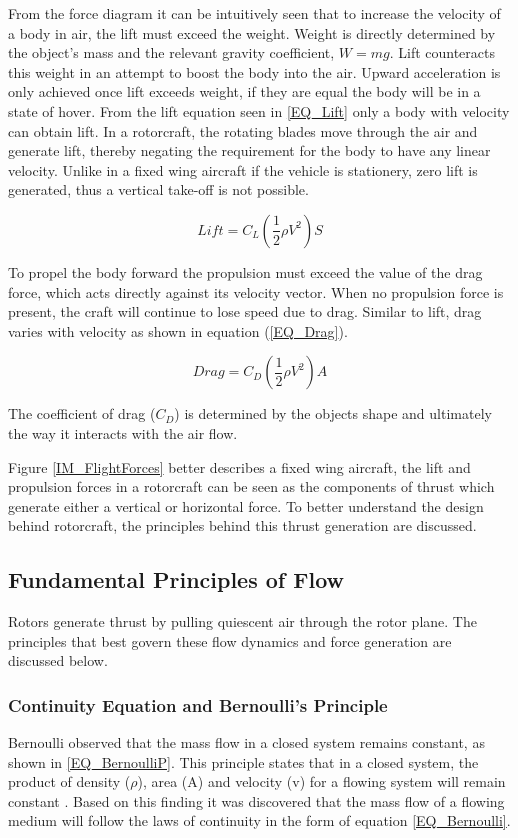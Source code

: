 From the force diagram it can be intuitively seen that to increase the velocity of a body in air, the lift must exceed the weight.
Weight is directly determined by the object's mass and the relevant gravity coefficient, $W = mg$. Lift counteracts this weight in an attempt to boost the body into the air. Upward acceleration is only achieved once lift exceeds weight, if they are equal the body will be in a state of hover. From the lift equation seen in \eqref{EQ_Lift} only a body with velocity can obtain lift. In a rotorcraft, the rotating blades move through the air and generate lift, thereby negating the requirement for the body to have any linear velocity. Unlike in a fixed wing aircraft if the vehicle is stationery, zero lift is generated, thus a vertical take-off is not possible. 

\begin{equation}
\label{EQ_Lift}
Lift = C_L(\frac{1}{2} \rho V^2) S
\end{equation}

To propel the body forward the propulsion must exceed the value of the drag force, which acts directly against its velocity vector. When no propulsion force is present, the craft will continue to lose speed due to drag. Similar to lift, drag varies with velocity as shown in equation (\ref{EQ_Drag}).

\begin{equation}
\label{EQ_Drag}
Drag = C_D (\frac{1}{2} \rho V^2) A
\end{equation}

The coefficient of drag ($C_D$) is determined by the objects shape and ultimately the way it interacts with the air flow. 

Figure \ref{IM_FlightForces} better describes a fixed wing aircraft, the lift and propulsion forces in a rotorcraft can be seen as the components of thrust which generate either a vertical or horizontal force. To better understand the design behind rotorcraft, the principles behind this thrust generation are discussed.

	\subsection{Fundamental Principles of Flow}
	Rotors generate thrust by pulling quiescent air through the rotor plane. The principles that best govern these flow dynamics and force generation are discussed below.
	
		\subsubsection{Continuity Equation and Bernoulli's Principle}
		Bernoulli observed that the mass flow in a closed system remains constant, as shown in \eqref{EQ_BernoulliP}. This principle states that in a closed system, the product of density ($\rho$), area (A) and velocity (v) for a flowing system will remain constant \cite{Dayle}. Based on this finding it was discovered that the mass flow of a flowing medium will follow the laws of continuity in the form of equation \eqref{EQ_Bernoulli}.
		

